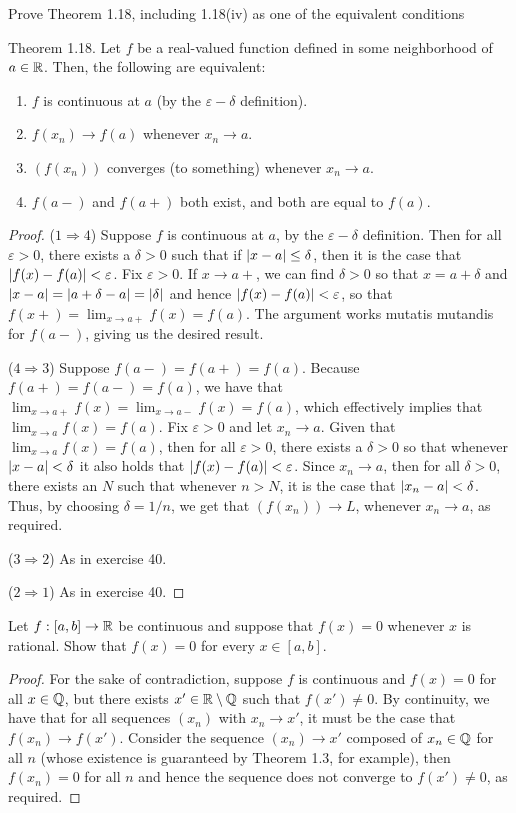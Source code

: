\begin{exercise}{41}
Prove Theorem 1.18, including 1.18(iv) as one of the equivalent conditions

Theorem 1.18. Let $f$ be a real-valued function defined in some neighborhood of $a\in\mathbb{R}$. Then, the following are equivalent:
\begin{enumerate}
    \item $f$ is continuous at $a$ (by the $\varepsilon-\delta$ definition).
    \item $f(x_n)\to f(a)$ whenever $x_n\to a$.
    \item $(f(x_n))$ converges (to something) whenever $x_n\to a$.
    \item $f(a-)$ and $f(a+)$ both exist, and both are equal to $f(a).$
\end{enumerate}
\end{exercise}
\begin{proof}
($1\Rightarrow 4$) Suppose $f$ is continuous at $a$, by the $\varepsilon-\delta$ definition. Then for all $\varepsilon>0$, there exists a $\delta >0$ such that if $\left\lvert x-a\right\rvert\leq\delta$, then it is the case that $\left\lvert f(x)-f(a)\right\rvert<\varepsilon$. Fix $\varepsilon>0$. If $x\to a+$, we can find $\delta>0$ so that $x=a+\delta$ and $\left\lvert x-a\right\rvert=\left\lvert a+\delta-a\right\rvert=\left\lvert \delta\right\rvert$ and hence $\left\lvert f(x)-f(a)\right\rvert<\varepsilon$, so that $f(x+)=\lim_{x\to a+}f(x)=f(a)$. The argument works mutatis mutandis for $f(a-)$, giving us the desired result.

($4\Rightarrow 3$) Suppose $f(a-)=f(a+)=f(a)$. Because $f(a+)=f(a-)=f(a)$, we have that $\lim_{x\to a+}f(x)=\lim_{x\to a-}f(x)=f(a)$, which effectively implies that $\lim_{x\to a}f(x)=f(a)$. Fix $\varepsilon>0$ and let $x_n\to a$. Given that $\lim_{x\to a}f(x)=f(a)$, then for all $\varepsilon>0$, there exists a $\delta>0$ so that whenever $\left\lvert x-a\right\rvert<\delta$ it also holds that $\left\lvert f(x)-f(a)\right\rvert<\varepsilon$. Since $x_n\to a$, then for all $\delta>0$, there exists an $N$ such that whenever $n> N$, it is the case that $\left\lvert x_n-a\right\rvert<\delta$. Thus, by choosing $\delta =1/n$, we get that $(f(x_n))\to L$, whenever $x_n\to a$, as required.

($3\Rightarrow 2$) As in exercise 40.

($2\Rightarrow 1$) As in exercise 40.
\end{proof}

\begin{exercise}{45}
Let $f:[a,b]\to\mathbb{R}$ be continuous and suppose that $f(x)=0$ whenever $x$ is rational. Show that $f(x)=0$ for every $x\in[a,b]$.
\end{exercise}
\begin{proof}
For the sake of contradiction, suppose $f$ is continuous and $f(x)=0$ for all $x\in\mathbb{Q}$, but there exists $x'\in\mathbb{R}\setminus\mathbb{Q}$ such that $f(x')\neq 0$. By continuity, we have that for all sequences $(x_n)$ with $x_n\to x'$, it must be the case that $f(x_n)\to f(x')$. Consider the sequence $(x_n)\to x'$ composed of $x_n\in\mathbb{Q}$ for all $n$ (whose existence is guaranteed by Theorem 1.3, for example), then $f(x_n)=0$ for all $n$ and hence the sequence does not converge to $f(x')\neq 0$, as required.
\end{proof}

